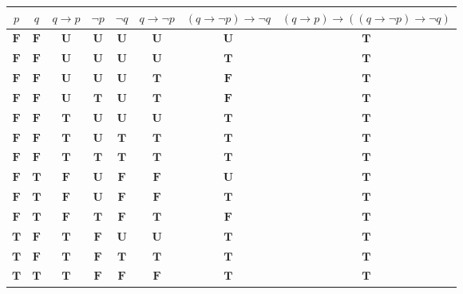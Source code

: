\documentclass[12pt]{article}
\begin{document}
{\begin{longtable}[]{@{}cccccccc@{}}
\toprule
\(p\)& \(q\)& \(q \to p\)& \(\neg p\)& \(\neg q\)& \(q \to \neg p\)& \((q \to \neg p) \to \neg q\)& \((q \to p) \to ((q \to \neg p) \to \neg q)\)\tabularnewline
\midrule
\endhead
 \(\textbf{F}\)  &  \(\textbf{F}\)  &  \(\textbf{U}\)  &  \(\textbf{U}\)  &  \(\textbf{U}\)  &  \(\textbf{U}\)  &  \(\textbf{U}\)  &  \(\textbf{T}\) \tabularnewline
 \(\textbf{F}\)  &  \(\textbf{F}\)  &  \(\textbf{U}\)  &  \(\textbf{U}\)  &  \(\textbf{U}\)  &  \(\textbf{U}\)  &  \(\textbf{T}\)  &  \(\textbf{T}\) \tabularnewline
 \(\textbf{F}\)  &  \(\textbf{F}\)  &  \(\textbf{U}\)  &  \(\textbf{U}\)  &  \(\textbf{U}\)  &  \(\textbf{T}\)  &  \(\textbf{F}\)  &  \(\textbf{T}\) \tabularnewline
 \(\textbf{F}\)  &  \(\textbf{F}\)  &  \(\textbf{U}\)  &  \(\textbf{T}\)  &  \(\textbf{U}\)  &  \(\textbf{T}\)  &  \(\textbf{F}\)  &  \(\textbf{T}\) \tabularnewline
 \(\textbf{F}\)  &  \(\textbf{F}\)  &  \(\textbf{T}\)  &  \(\textbf{U}\)  &  \(\textbf{U}\)  &  \(\textbf{U}\)  &  \(\textbf{T}\)  &  \(\textbf{T}\) \tabularnewline
 \(\textbf{F}\)  &  \(\textbf{F}\)  &  \(\textbf{T}\)  &  \(\textbf{U}\)  &  \(\textbf{T}\)  &  \(\textbf{T}\)  &  \(\textbf{T}\)  &  \(\textbf{T}\) \tabularnewline
 \(\textbf{F}\)  &  \(\textbf{F}\)  &  \(\textbf{T}\)  &  \(\textbf{T}\)  &  \(\textbf{T}\)  &  \(\textbf{T}\)  &  \(\textbf{T}\)  &  \(\textbf{T}\) \tabularnewline
 \(\textbf{F}\)  &  \(\textbf{T}\)  &  \(\textbf{F}\)  &  \(\textbf{U}\)  &  \(\textbf{F}\)  &  \(\textbf{F}\)  &  \(\textbf{U}\)  &  \(\textbf{T}\) \tabularnewline
 \(\textbf{F}\)  &  \(\textbf{T}\)  &  \(\textbf{F}\)  &  \(\textbf{U}\)  &  \(\textbf{F}\)  &  \(\textbf{F}\)  &  \(\textbf{T}\)  &  \(\textbf{T}\) \tabularnewline
 \(\textbf{F}\)  &  \(\textbf{T}\)  &  \(\textbf{F}\)  &  \(\textbf{T}\)  &  \(\textbf{F}\)  &  \(\textbf{T}\)  &  \(\textbf{F}\)  &  \(\textbf{T}\) \tabularnewline
 \(\textbf{T}\)  &  \(\textbf{F}\)  &  \(\textbf{T}\)  &  \(\textbf{F}\)  &  \(\textbf{U}\)  &  \(\textbf{U}\)  &  \(\textbf{T}\)  &  \(\textbf{T}\) \tabularnewline
 \(\textbf{T}\)  &  \(\textbf{F}\)  &  \(\textbf{T}\)  &  \(\textbf{F}\)  &  \(\textbf{T}\)  &  \(\textbf{T}\)  &  \(\textbf{T}\)  &  \(\textbf{T}\) \tabularnewline
 \(\textbf{T}\)  &  \(\textbf{T}\)  &  \(\textbf{T}\)  &  \(\textbf{F}\)  &  \(\textbf{F}\)  &  \(\textbf{F}\)  &  \(\textbf{T}\)  &  \(\textbf{T}\) \tabularnewline
\bottomrule
\end{longtable}


}
\end{document}

